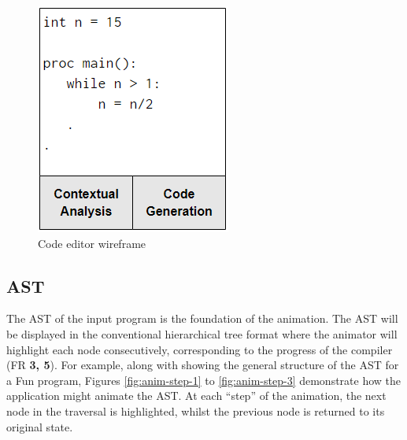\documentclass{l4proj}
\begin{document}
\begin{figure}[h]
\centering
\includegraphics[scale=0.6]{images/code-editor-wireframe.png}
\caption{Code editor wireframe}
\label{fig:code-editor-wireframe}	
\end{figure}

\subsection{AST}
The AST of the input program is the foundation of the animation. The AST will be displayed in the conventional hierarchical tree format where the animator will highlight each node consecutively, corresponding to the progress of the compiler (FR \textbf{3, 5}). For example, along with showing the general structure of the AST for a Fun program, Figures \ref{fig:anim-step-1} to \ref{fig:anim-step-3} demonstrate how the application might animate the AST. At each ``step'' of the animation, the next node in the traversal is highlighted, whilst the previous node is returned to its original state.
\end{document}
